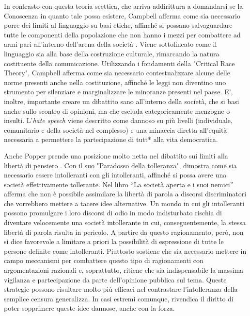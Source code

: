 In contrasto con questa teoria scettica, che arriva addirittura a domandarsi se la Conoscenza in quanto tale possa esistere, Campbell afferma come sia necessario porre dei limiti al linguaggio su basi etiche, affinché si possano salvaguardare tutte le componenti della popolazione che non hanno i mezzi per combattere ad armi pari all'interno dell'arena della società \citep{campbell2004}. Viene sottolineato come il linguaggio sia alla base della costruzione culturale, rimarcando la natura costituente della comunicazione. Utilizzando i fondamenti della "Critical Race Theory", Campbell afferma come sia necessario contestualizzare alcune delle norme presenti anche nella costituzione, affinché le leggi non diventino uno strumento per silenziare e marginalizzare le minoranze presenti nel paese. E’, inoltre,  importante creare un dibattito sano all'interno della società, che si basi anche sullo scontro di opinioni, ma  che escluda categoricamente menzogne o insulti. L'\textit{hate speech} viene descritto come dannoso su più livelli (individuale, comunitario e della società nel complesso) e una minaccia diretta all'equità necessaria a permettere la partecipazione di tutt* alla vita democratica.

Anche Popper prende una posizione molto netta nel dibattito sui limiti alla libertà di pensiero \citep{popper1945}. Con il suo "Paradosso della tolleranza", dimostra come sia necessario essere intolleranti con gli intolleranti, affinché si possa avere una società effettivamente tollerante. Nel libro “La società aperta e i suoi nemici” afferma che non è possibile assimilare la libertà di parola a discorsi discriminatori che vorrebbero mettere a tacere idee alternative. Un mondo in cui gli intolleranti possono promulgare i loro discorsi di odio in modo indisturbato rischia di diventare velocemente una società intollerante in cui, conseguentemente, la stessa libertà di parola risulta in pericolo. A partire da questo ragionamento, però, non si dice favorevole a limitare a priori la possibilità di espressione di tutte le persone definite come intolleranti. Piuttosto sostiene  che sia necessario mettere in campo meccanismi per combattere questo tipo di ragionamenti con argomentazioni razionali e, soprattutto, ritiene che sia indispensabile la massima vigilanza e partecipazione da parte dell'opinione pubblica sul tema. Queste strategie possono risultare molto più efficaci nel contrastare l'intolleranza della semplice censura generalizza. In casi estremi comunque, rivendica il diritto di poter sopprimere queste idee dannose, anche con la forza.


